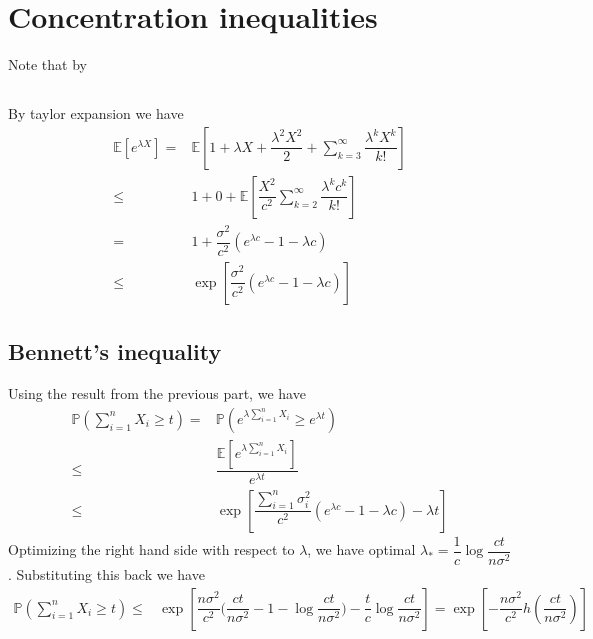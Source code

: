 \documentclass[11pt,a4paper]{ctexart}
\numberwithin{equation}{section}%
\begin{document}
\section{Concentration inequalities}

Note that by 

\subsection{}
By taylor expansion we have
\begin{align*}
    \mathbb{E}\left[ e^{\lambda X} \right] =& \mathbb{E}\left[ 1 + \lambda X +  \dfrac{ \lambda ^2 X^2 }{ 2 } + \sum_{k=3}^\infty \dfrac{ \lambda ^k X^k }{ k! }  \right] \\
    \leq & 1+0+ \mathbb{E}\left[ \dfrac{ X^2 }{ c^2 }\sum_{k=2}^\infty \dfrac{ \lambda ^k c^k }{ k! }  \right] \\
    =& 1+ \dfrac{ \sigma ^2 }{ c^2 }(e^{\lambda c}-1-\lambda c) \\
    \leq & \exp\left[ \dfrac{ \sigma ^2 }{ c^2 }(e^{\lambda c}-1-\lambda c) \right] 
\end{align*}


\subsection{Bennett's inequality}

Using the result from the previous part, we have
\begin{align*}
    \mathbb{P}\left( \sum_{i=1}^n X_i \geq t \right) =& \mathbb{P}\left( e^{\lambda \sum_{i=1}^n X_i} \geq e^{\lambda t} \right) \\
    \leq & \dfrac{ \mathbb{E}\left[ e^{\lambda \sum_{i=1}^n X_i} \right] }{ e^{\lambda t} } \\
    \leq & \exp\left[ \dfrac{ \sum_{i=1}^n \sigma_i^2 }{ c^2 }(e^{\lambda c} - 1 - \lambda c)  - \lambda t \right]  
\end{align*}
Optimizing the right hand side with respect to $ \lambda $, we have optimal $ \lambda _* = \dfrac{ 1 }{ c }\log \dfrac{ ct }{ n\sigma ^2 }   $. Substituting this back we have
\begin{align*}
    \mathbb{P}\left( \sum_{i=1}^n X_i \geq t \right) \leq & \exp\left[ \dfrac{ n\sigma ^2 }{ c^2 }\big(\dfrac{ ct }{ n\sigma ^2 } -1-\log\dfrac{ ct  }{ n\sigma ^2 } \big)- \dfrac{ t }{ c  } \log \dfrac{ ct  }{ n\sigma ^2 }   \right] = \exp\left[ -\dfrac{ n\sigma ^2 }{ c^2 }h(\dfrac{ ct  }{ n\sigma ^2 } )  \right]
\end{align*}
\end{document}
